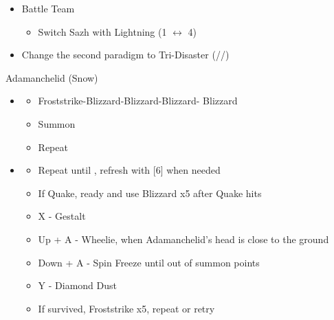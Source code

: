 \begin{multicols}{2}
\begin{menu}
\begin{itemize}
\begin{itemize}
\begin{itemize}
              \item Battle Team
                    \begin{itemize}
                      \item Switch Sazh with Lightning (1 $\leftrightarrow$ 4)
                    \end{itemize}
              \item Change the second paradigm to Tri-Disaster (\rav/\rav/\rav)
            \end{itemize}
          \end{itemize}
  \end{itemize}
\end{menu}

\begin{battle}{Adamanchelid (Snow)}
  \begin{itemize}
    \item \sixth
          \begin{itemize}
            \item Froststrike-Blizzard-Blizzard-Blizzard- Blizzard
            \item Summon
            \item Repeat
          \end{itemize}
    \item \fifth
          \begin{itemize}
            \item Repeat until \stagger, refresh with [6] when needed
            \item If Quake, ready and use Blizzard x5 after Quake hits
            \item X - Gestalt
            \item Up + A - Wheelie, when Adamanchelid's head is close to the ground
            \item Down + A - Spin Freeze until out of summon points
            \item Y - Diamond Dust
            \item If survived, Froststrike x5, repeat or retry
          \end{itemize}
  \end{itemize}
\end{battle}


\end{multicols}
